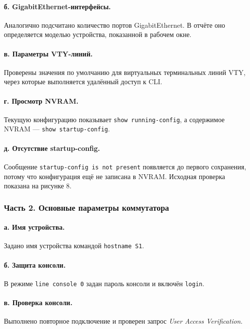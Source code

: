 \documentclass[a4paper,14pt,oneside]{extarticle}
\begin{document}
\paragraph{б. GigabitEthernet-интерфейсы.}
Аналогично подсчитано количество портов GigabitEthernet. В отчёте оно
определяется моделью устройства, показанной в рабочем окне.

\paragraph{в. Параметры VTY-линий.}
Проверены значения по умолчанию для виртуальных терминальных линий VTY,
через которые выполняется удалённый доступ к CLI.

\paragraph{г. Просмотр NVRAM.}
Текущую конфигурацию показывает \texttt{show running-config}, а содержимое
NVRAM --- \texttt{show startup-config}.

\paragraph{д. Отсутствие startup-config.}
Сообщение \texttt{startup-config is not present} появляется до первого
сохранения, потому что конфигурация ещё не записана в NVRAM. Исходная
проверка показана на рисунке 8.

\subsubsection{Часть 2. Основные параметры коммутатора}

\paragraph{а. Имя устройства.}
Задано имя устройства командой \texttt{hostname S1}.

\paragraph{б. Защита консоли.}
В режиме \texttt{line console 0} задан пароль консоли и включён
\texttt{login}.

\paragraph{в. Проверка консоли.}
Выполнено повторное подключение и проверен запрос
\textit{User Access Verification}.
\end{document}
